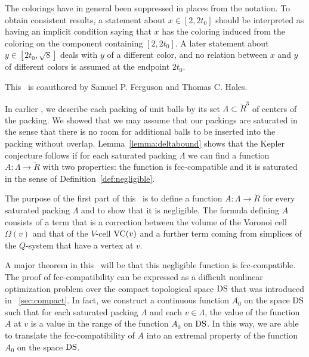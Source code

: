 The colorings have in general been suppressed in places from the
notation. To obtain consistent results, a statement about
$x\in[2,2t_0]$ should be interpreted as having an implicit
condition saying that $x$ has the coloring induced from the
coloring on the component containing $[2,2t_0]$.  A later
statement about $y\in[2t_0,\sqrt8]$ deals with $y$ of a different
color, and no relation between $x$ and $y$ of different colors is
assumed at the endpoint $2t_0$.





\label{sec:scoring}

This \chap\  is coauthored by
Samuel P. Ferguson and Thomas C. Hales.

In earlier \chaps, we describe each packing of unit balls by its set
$\Lambda\subset \ring{R}^3$ of centers of the packing.  We showed
that we may assume that our packings are saturated in the sense that
there is no room for additional balls to be inserted into the
packing without overlap. Lemma~\ref{lemma:deltabound} shows that the
Kepler conjecture follows if for each saturated packing $\Lambda$ we
can find a function $A:\Lambda\to\ring{R}$ with two properties: the
function is fcc-compatible and it is saturated in the sense of
Definition~\ref{def:negligible}.

The purpose of the first part of this \chap\ is to define a
function $A:\Lambda\to\ring{R}$ for every saturated packing
$\Lambda$ and to show that it is negligible.  The formula defining
$A$ consists of a term that is a correction between the volume of
the Voronoi cell $\Omega(v)$ and that of the $V$-cell ${\operatorname{VC}}(v)$
and a further term coming from simplices of the $Q$-system that
have a vertex at $v$.

A major theorem in this \paper\ will be that this negligible
function is fcc-compatible.  The proof of fcc-compatibility can be
expressed as a difficult nonlinear optimization problem over the
compact topological space ${\operatorname{DS}}$ that was introduced in
\Chap~\ref{sec:compact}.  In fact, we construct a continuous
function $A_0$ on the space ${\operatorname{DS}}$ such that for each saturated
packing $\Lambda$ and each $v\in\Lambda$, the value of the function
$A$ at $v$ is a value in the range of the function $A_0$ on
${\operatorname{DS}}$. In this way, we are able to translate the
fcc-compatibility of $A$ into an extremal property of the function
$A_0$ on the space ${\operatorname{DS}}$.

